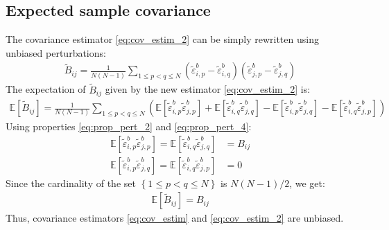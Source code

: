 \documentclass[12pt]{scrartcl}
\begin{document}
\subsection{Expected sample covariance}
The covariance estimator \eqref{eq:cov_estim_2} can be simply rewritten using unbiased perturbations:
\begin{align}
\widetilde{B}_{ij} = \frac{1}{N(N-1)} \sum_{1 \le p < q \le N} \left(\widetilde{\varepsilon}^b_{i,p} - \widetilde{\varepsilon}^b_{i,q}\right) \left(\widetilde{\varepsilon}^b_{j,p} - \widetilde{\varepsilon}^b_{j,q}\right)
\end{align}
The expectation of $\widetilde{B}_{ij}$ given by the new estimator \eqref{eq:cov_estim_2} is:
\begin{align}
\mathbb{E} \left[\widetilde{B}_{ij}\right] = \frac{1}{N(N-1)} \sum_{1 \le p < q \le N} \left(\mathbb{E} \left[\widetilde{\varepsilon}^b_{i,p} \widetilde{\varepsilon}^b_{j,p}\right] + \mathbb{E} \left[\widetilde{\varepsilon}^b_{i,q} \widetilde{\varepsilon}^b_{j,q}\right] - \mathbb{E} \left[\widetilde{\varepsilon}^b_{i,p} \widetilde{\varepsilon}^b_{j,q}\right] - \mathbb{E} \left[\widetilde{\varepsilon}^b_{i,q} \widetilde{\varepsilon}^b_{j,p}\right]\right)
\end{align}
Using properties \eqref{eq:prop_pert_2} and \eqref{eq:prop_pert_4}:
\begin{subequations}
\begin{align}
\mathbb{E} \left[\widetilde{\varepsilon}^b_{i,p} \widetilde{\varepsilon}^b_{j,p}\right] = \mathbb{E} \left[\widetilde{\varepsilon}^b_{i,q} \widetilde{\varepsilon}^b_{j,q}\right] & = B_{ij} \\
\mathbb{E} \left[\widetilde{\varepsilon}^b_{i,p} \widetilde{\varepsilon}^b_{j,q}\right] = \mathbb{E} \left[\widetilde{\varepsilon}^b_{i,q} \widetilde{\varepsilon}^b_{j,p}\right] & = 0
\end{align}
\end{subequations}
Since the cardinality of the set $\left\{1 \le p < q \le N\right\}$ is $N(N-1)/2$, we get:
\begin{align}
\label{eq:exp_cov}
\mathbb{E} \left[\widetilde{B}_{ij}\right] = B_{ij}
\end{align}
Thus, covariance estimators \eqref{eq:cov_estim} and \eqref{eq:cov_estim_2} are unbiased.
\end{document}
